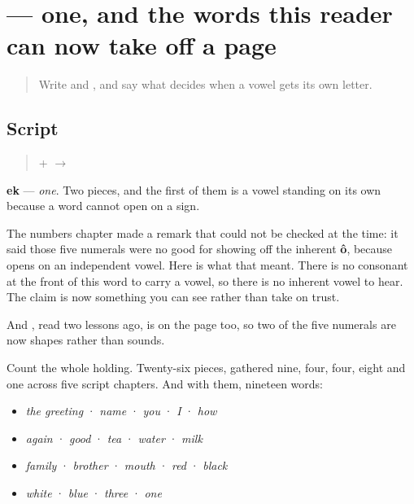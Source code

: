 \section[\texorpdfstring{\bn{এক} (ek)}{এক (ek)}]{ — one, and the words this reader can now take off a page}

\label{lesson:BN-W04-ek-read}



\begin{quote}
Write \textbf{} and \textbf{}, and say what decides when a vowel gets its own letter.
\end{quote}

\subsection*{Script}
\begin{quote}
\textbf{} + \textbf{} $\to$ \textbf{}
\end{quote}

\textbf{ek} — \emph{one}. Two pieces, and the first of them is a vowel standing on its own because a word cannot open on a sign.

The numbers chapter made a remark that could not be checked at the time: it said those five numerals were no good for showing off the inherent \textbf{ô}, because \textbf{} opens on an independent vowel. Here is what that meant. There is no consonant at the front of this word to carry a vowel, so there is no inherent vowel to hear. The claim is now something you can see rather than take on trust.

And \textbf{}, read two lessons ago, is on the page too, so two of the five numerals are now shapes rather than sounds.

Count the whole holding. Twenty-six pieces, gathered nine, four, four, eight and one across five script chapters. And with them, nineteen words:

\begin{itemize}
\raggedright
  \item \textbf{} \emph{the greeting} · \textbf{} \emph{name} · \textbf{} \emph{you} · \textbf{} \emph{I} · \textbf{} \emph{how}
  \item \textbf{} \emph{again} · \textbf{} \emph{good} · \textbf{} \emph{tea} · \textbf{} \emph{water} · \textbf{} \emph{milk}
  \item \textbf{} \emph{family} · \textbf{} \emph{brother} · \textbf{} \emph{mouth} · \textbf{} \emph{red} · \textbf{} \emph{black}
  \item \textbf{} \emph{white} · \textbf{} \emph{blue} · \textbf{} \emph{three} · \textbf{} \emph{one}
\end{itemize}

